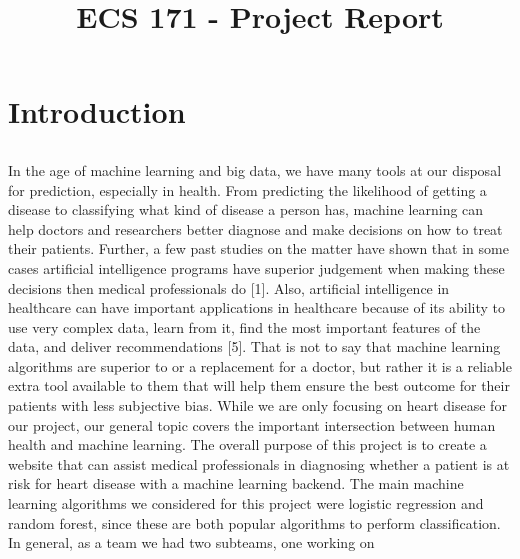 \documentclass[12pt]{article}
\title{\textbf{ECS 171 - Project Report}}
\author{}
\date{}
\begin{document}
\titlespacing*{\section}{0pt}{0.25cm}{0.25cm}
\titlespacing*{\subsection}{0pt}{0.5cm}{0.5cm}
\maketitle

\section*{Introduction}

\subsection*{}
In the age of machine learning and big data, we have many tools at our 
disposal for prediction, especially in health. From predicting the 
likelihood of getting a disease to classifying what kind of disease a 
person has, machine learning can help doctors and researchers better 
diagnose and make decisions on how to treat their patients. Further, a few 
past studies on the matter have shown that in some cases artificial 
intelligence programs have superior judgement when making these decisions 
then medical professionals do [1]. Also, artificial intelligence in 
healthcare can have important applications in healthcare because of 
its ability to use very complex data, learn from it, find the most 
important features of the data, and deliver recommendations [5]. 
That is not to say that machine learning algorithms are superior to or a 
replacement for a doctor, but rather it is a reliable extra tool available 
to them that will help them ensure the best outcome for their patients 
with less subjective bias. While we are only focusing on heart disease 
for our project, our general topic covers the important intersection 
between human health and machine learning.
The overall purpose of this project is to create a website that can assist 
medical professionals in diagnosing whether a patient is at risk for heart 
disease with a machine learning backend. The main machine learning 
algorithms we considered for this project were logistic regression 
and random forest, since these are both popular algorithms to perform 
classification. In general, as a team we had two subteams, one working on 
\end{document}
